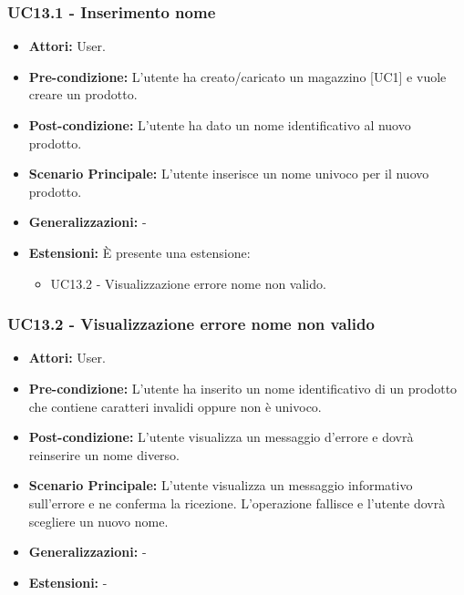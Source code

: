 \subsubsection{UC13.1 - Inserimento nome}
\begin{itemize}
    \item \textbf{Attori:} User.
    \item \textbf{Pre-condizione:}  L'utente ha creato/caricato un magazzino [UC1] e vuole creare un prodotto.
    \item \textbf{Post-condizione:} L'utente ha dato un nome identificativo al nuovo prodotto.
    \item \textbf{Scenario Principale:}  L'utente inserisce un nome univoco per il nuovo prodotto.
    \item \textbf{Generalizzazioni:} -
    \item \textbf{Estensioni:} È presente una estensione:
    \begin{itemize}
        \item UC13.2 - Visualizzazione errore nome non valido.
    \end{itemize}
\end{itemize}


\subsubsection{UC13.2 - Visualizzazione errore nome non valido}
\begin{itemize}
    \item \textbf{Attori:} User.
    \item \textbf{Pre-condizione:}  L'utente ha inserito un nome identificativo di un prodotto che contiene caratteri invalidi oppure non è univoco.
    \item \textbf{Post-condizione:}  L'utente visualizza un messaggio d'errore e dovrà reinserire un nome diverso.
    \item \textbf{Scenario Principale:}  L'utente visualizza un messaggio informativo sull'errore e ne conferma la ricezione. L'operazione fallisce e l'utente dovrà scegliere un nuovo nome.
    \item \textbf{Generalizzazioni:} -
    \item \textbf{Estensioni:} -
\end{itemize}